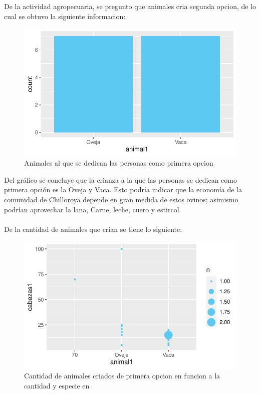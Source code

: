 \documentclass[12pt]{article}\usepackage[]{graphicx}\usepackage[]{xcolor}
\makeatletter
\def\maxwidth{ %
  \ifdim\Gin@nat@width>\linewidth
    \linewidth
  \else
    \Gin@nat@width
  \fi
}
\newenvironment{knitrout}{}{} %
\makeatother
\begin{document}
	
	De la actividad agropecuaria, se pregunto que animales cria segunda opcion, de lo cual se obtuvo la siguiente informacion:
	\begin{figure}[H]
	\centering
\begin{knitrout}
\color{fgcolor}
\includegraphics[width=\maxwidth]{figure/fifteen-1} 
\end{knitrout}
	\caption{Animales al que se dedican las personas como primera opcion}
	\end{figure}
	Del gráfico se concluye que la crianza a la que las personas se dedican como primera opción es la Oveja y Vaca. Esto podría indicar que la economía de la comunidad de Chilloroya depende en gran medida de estos ovinos; asimismo podrían aprovechar la lana, Carne, leche, cuero y estircol.\\
	\\
	De la cantidad de animales que crian se tiene lo siguiente:
	\begin{figure}[H]
	\centering
\begin{knitrout}
\color{fgcolor}
\includegraphics[width=\maxwidth]{figure/sixteen-1} 
\end{knitrout}
	\caption{Cantidad de animales criados de primera opcion en funcion a la cantidad y especie en \comunidad}
	\end{figure}
\end{document}
